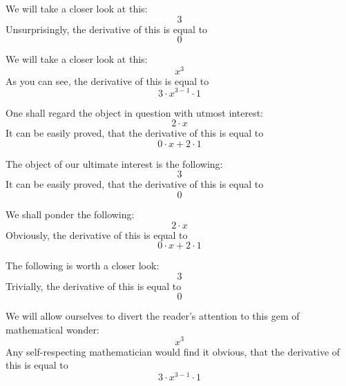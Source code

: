 \documentclass{article}
\begin{document}
We will take a closer look at this:
\begin{equation}
3 
\end{equation}
Unsurprisingly, the derivative of this is equal to
\begin{equation}
0 
\end{equation}

We will take a closer look at this:
\begin{equation}
x ^{3 } 
\end{equation}
As you can see, the derivative of this is equal to
\begin{equation}
3 \cdot x ^{3 - 1 } \cdot 1 
\end{equation}

One shall regard the object in question with utmost interest:
\begin{equation}
2 \cdot x 
\end{equation}
It can be easily proved, that the derivative of this is equal to
\begin{equation}
0 \cdot x + 2 \cdot 1 
\end{equation}

The object of our ultimate interest is the following:
\begin{equation}
3 
\end{equation}
It can be easily proved, that the derivative of this is equal to
\begin{equation}
0 
\end{equation}

We shall ponder the following:
\begin{equation}
2 \cdot x 
\end{equation}
Obviously, the derivative of this is equal to
\begin{equation}
0 \cdot x + 2 \cdot 1 
\end{equation}

The following is worth a closer look:
\begin{equation}
3 
\end{equation}
Trivially, the derivative of this is equal to
\begin{equation}
0 
\end{equation}

We will allow ourselves to divert the reader's attention to this gem of mathematical wonder:
\begin{equation}
x ^{3 } 
\end{equation}
Any self-respecting mathematician would find it obvious, that the derivative of this is equal to
\begin{equation}
3 \cdot x ^{3 - 1 } \cdot 1 
\end{equation}
\end{document}
